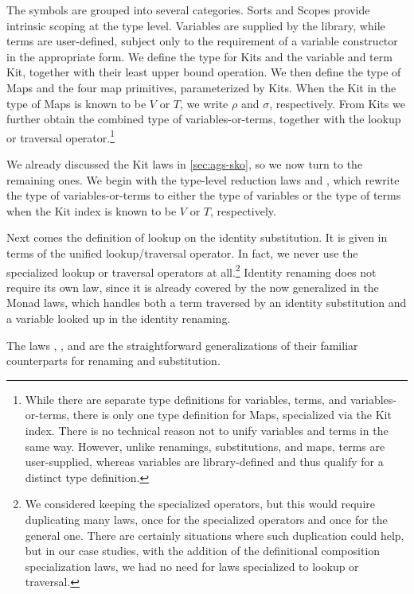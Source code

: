 \documentclass[screen,nonacm]{acmart}
\begin{document}
The symbols are grouped into several categories. Sorts and Scopes provide
intrinsic scoping at the type level. Variables are supplied by the library,
while terms are user-defined, subject only to the requirement of a variable
constructor in the appropriate form. We define the type for Kits and the
variable and term Kit, together with their least upper bound operation. We then
define the type of Maps and the four map primitives, parameterized by Kits.
When the Kit in the type of Maps is known to be $V$ or $T$, we write $\rho$ and
$\sigma$, respectively. From Kits we further obtain the combined type of
variables-or-terms, together with the lookup or traversal
operator.\footnote{While there are separate type definitions for variables,
      terms, and variables-or-terms, there is only one type definition for Maps,
      specialized via the Kit index. There is no technical reason not to unify
      variables and terms in the same way. However, unlike renamings, substitutions,
      and maps, terms are user-supplied, whereas variables are library-defined and
      thus qualify for a distinct type definition.}%

We already discussed the Kit laws in \cref{sec:ags-sko}, so we now turn to the
remaining ones. We begin with the type-level reduction laws 
and , which rewrite the type of variables-or-terms to either
the type of variables or the type of terms when the Kit index is known to be
$V$ or $T$, respectively.

Next comes the definition of lookup on the identity substitution. It is given
in terms of the unified lookup/traversal operator. In fact, we never use the
specialized lookup or traversal operators at all.\footnote{ We considered
      keeping the specialized operators, but this would require duplicating many
      laws, once for the specialized operators and once for the general one. There
      are certainly situations where such duplication could help, but in our case
      studies, with the addition of the definitional composition specialization laws,
      we had no need for laws specialized to lookup or traversal.} Identity renaming
does not require its own law, since it is already covered by the now generalized
 in the Monad laws, which handles both a term traversed by
an identity substitution and a variable looked up in the identity renaming.

The laws , , and  are
the straightforward generalizations of their familiar counterparts for renaming
and substitution.
\end{document}
